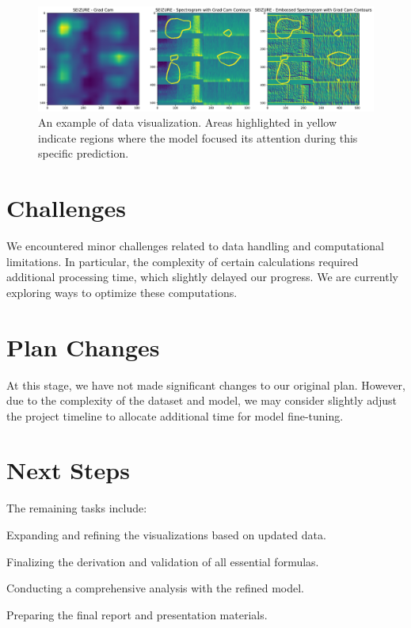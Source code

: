 \documentclass[10pt]{article}
\begin{document}
\begin{figure}[tbp]
\centering
\includegraphics[width=.8\textwidth]{grad_cam_SEIZURE_3}
\caption{An example of data visualization. Areas highlighted in yellow
indicate regions where the model focused its attention during this specific
prediction.}
\label{fig:SEIZURE_3}
\end{figure}


\section{Challenges}


We encountered minor challenges related to data handling and computational
limitations. In particular, the complexity of certain calculations required
additional processing time, which slightly delayed our progress.
We are currently exploring ways to optimize these computations.


\section{Plan Changes}


At this stage, we have not made significant changes to our original plan.
However, due to the complexity of the dataset and model, we may consider
slightly adjust the project timeline to allocate additional time for
model fine-tuning.


\section{Next Steps}


The remaining tasks include:
\begin{enumerate*}[label = (\roman*)]
\item Expanding and refining the visualizations based on updated data.
\item Finalizing the derivation and validation of all essential formulas.
\item Conducting a comprehensive analysis with the refined model.
\item Preparing the final report and presentation materials.
\end{enumerate*}
\end{document}
